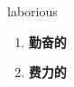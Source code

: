 
\begin{frame}
{\huge laborious}
\begin{center}
\begin{enumerate}\Large
  \item \textbf{勤奋的}
  \item \textbf{费力的}
\end{enumerate}
\end{center}
\end{frame}
